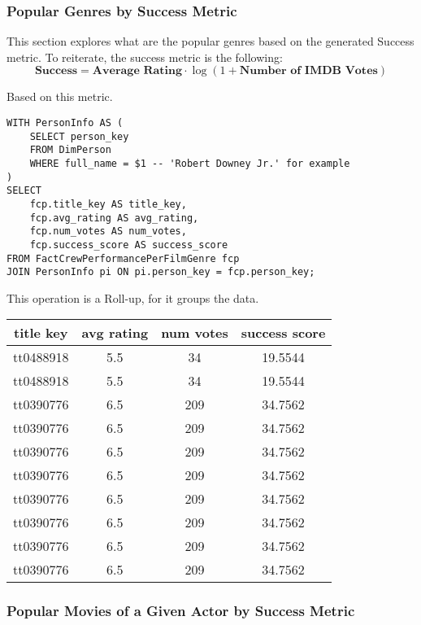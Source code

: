 \documentclass[sigconf, pbalance]{acmart}
\begin{document}
\subsubsection{Popular Genres by Success Metric}

This section explores what are the popular genres based on the generated Success metric. To reiterate, the success metric is the following:
$$
\textbf{Success} = \textbf{Average Rating} \cdot \log(1 + \textbf{Number of IMDB Votes})
$$

Based on this metric.


\begin{lstlisting}[style=SQLStyle]
WITH PersonInfo AS (
    SELECT person_key
    FROM DimPerson
    WHERE full_name = $1 -- 'Robert Downey Jr.' for example 
)
SELECT
    fcp.title_key AS title_key,
    fcp.avg_rating AS avg_rating,
    fcp.num_votes AS num_votes,
    fcp.success_score AS success_score
FROM FactCrewPerformancePerFilmGenre fcp
JOIN PersonInfo pi ON pi.person_key = fcp.person_key;
\end{lstlisting}

This operation is a Roll-up, for it groups the data.

\begin{center}
\begin{tabular}{|c|c|c|c|}
\hline
title key & avg rating & num votes & success score \\
\hline
tt0488918 & 5.5 & 34 & 19.5544 \\
tt0488918 & 5.5 & 34 & 19.5544 \\
tt0390776 & 6.5 & 209 & 34.7562 \\
tt0390776 & 6.5 & 209 & 34.7562 \\
tt0390776 & 6.5 & 209 & 34.7562 \\
tt0390776 & 6.5 & 209 & 34.7562 \\
tt0390776 & 6.5 & 209 & 34.7562 \\
tt0390776 & 6.5 & 209 & 34.7562 \\ 
tt0390776 & 6.5 & 209 & 34.7562 \\ 
tt0390776 & 6.5 & 209 & 34.7562 \\
\hline
\end{tabular}
\end{center}


\subsubsection{Popular Movies of a Given Actor by Success Metric}
\end{document}
